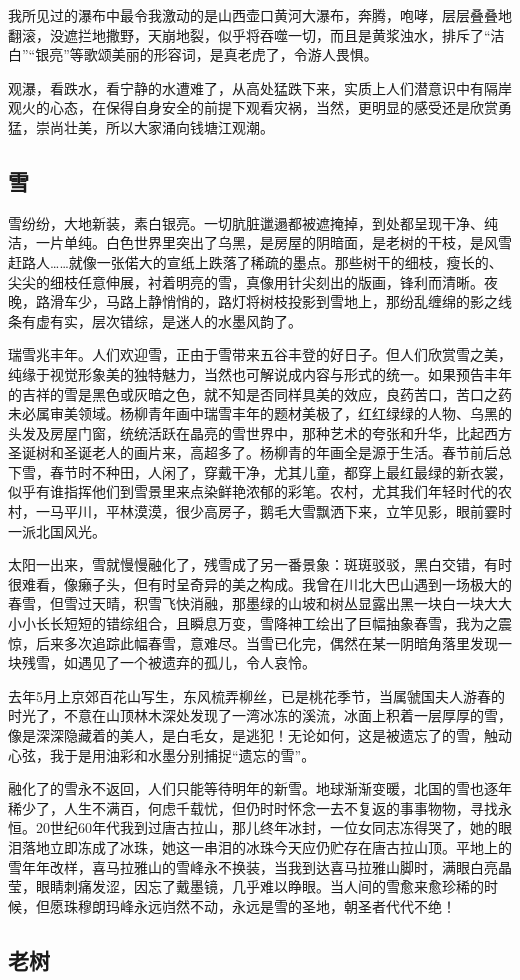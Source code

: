 \documentclass{article}
\begin{document}
我所见过的瀑布中最令我激动的是山西壶口黄河大瀑布，奔腾，咆哮，层层叠叠地翻滚，没遮拦地撒野，天崩地裂，似乎将吞噬一切，而且是黄浆浊水，排斥了“洁白”“银亮”等歌颂美丽的形容词，是真老虎了，令游人畏惧。

观瀑，看跌水，看宁静的水遭难了，从高处猛跌下来，实质上人们潜意识中有隔岸观火的心态，在保得自身安全的前提下观看灾祸，当然，更明显的感受还是欣赏勇猛，崇尚壮美，所以大家涌向钱塘江观潮。
\subsection{雪}
雪纷纷，大地新装，素白银亮。一切肮脏邋遢都被遮掩掉，到处都呈现干净、纯洁，一片单纯。白色世界里突出了乌黑，是房屋的阴暗面，是老树的干枝，是风雪赶路人……就像一张偌大的宣纸上跌落了稀疏的墨点。那些树干的细枝，瘦长的、尖尖的细枝任意伸展，衬着明亮的雪，真像用针尖刻出的版画，锋利而清晰。夜晚，路滑车少，马路上静悄悄的，路灯将树枝投影到雪地上，那纷乱缠绵的影之线条有虚有实，层次错综，是迷人的水墨风韵了。

瑞雪兆丰年。人们欢迎雪，正由于雪带来五谷丰登的好日子。但人们欣赏雪之美，纯缘于视觉形象美的独特魅力，当然也可解说成内容与形式的统一。如果预告丰年的吉祥的雪是黑色或灰暗之色，就不知是否同样具美的效应，良药苦口，苦口之药未必属审美领域。杨柳青年画中瑞雪丰年的题材美极了，红红绿绿的人物、乌黑的头发及房屋门窗，统统活跃在晶亮的雪世界中，那种艺术的夸张和升华，比起西方圣诞树和圣诞老人的画片来，高超多了。杨柳青的年画全是源于生活。春节前后总下雪，春节时不种田，人闲了，穿戴干净，尤其儿童，都穿上最红最绿的新衣裳，似乎有谁指挥他们到雪景里来点染鲜艳浓郁的彩笔。农村，尤其我们年轻时代的农村，一马平川，平林漠漠，很少高房子，鹅毛大雪飘洒下来，立竿见影，眼前霎时一派北国风光。

太阳一出来，雪就慢慢融化了，残雪成了另一番景象：斑斑驳驳，黑白交错，有时很难看，像癞子头，但有时呈奇异的美之构成。我曾在川北大巴山遇到一场极大的春雪，但雪过天晴，积雪飞快消融，那墨绿的山坡和树丛显露出黑一块白一块大大小小长长短短的错综组合，且瞬息万变，雪降神工绘出了巨幅抽象春雪，我为之震惊，后来多次追踪此幅春雪，意难尽。当雪已化完，偶然在某一阴暗角落里发现一块残雪，如遇见了一个被遗弃的孤儿，令人哀怜。

去年5月上京郊百花山写生，东风梳弄柳丝，已是桃花季节，当属虢国夫人游春的时光了，不意在山顶林木深处发现了一湾冰冻的溪流，冰面上积着一层厚厚的雪，像是深深隐藏着的美人，是白毛女，是逃犯！无论如何，这是被遗忘了的雪，触动心弦，我于是用油彩和水墨分别捕捉“遗忘的雪”。

融化了的雪永不返回，人们只能等待明年的新雪。地球渐渐变暖，北国的雪也逐年稀少了，人生不满百，何虑千载忧，但仍时时怀念一去不复返的事事物物，寻找永恒。20世纪60年代我到过唐古拉山，那儿终年冰封，一位女同志冻得哭了，她的眼泪落地立即冻成了冰珠，她这一串泪的冰珠今天应仍贮存在唐古拉山顶。平地上的雪年年改样，喜马拉雅山的雪峰永不换装，当我到达喜马拉雅山脚时，满眼白亮晶莹，眼睛刺痛发涩，因忘了戴墨镜，几乎难以睁眼。当人间的雪愈来愈珍稀的时候，但愿珠穆朗玛峰永远岿然不动，永远是雪的圣地，朝圣者代代不绝！
\subsection{老树}
\end{document}
